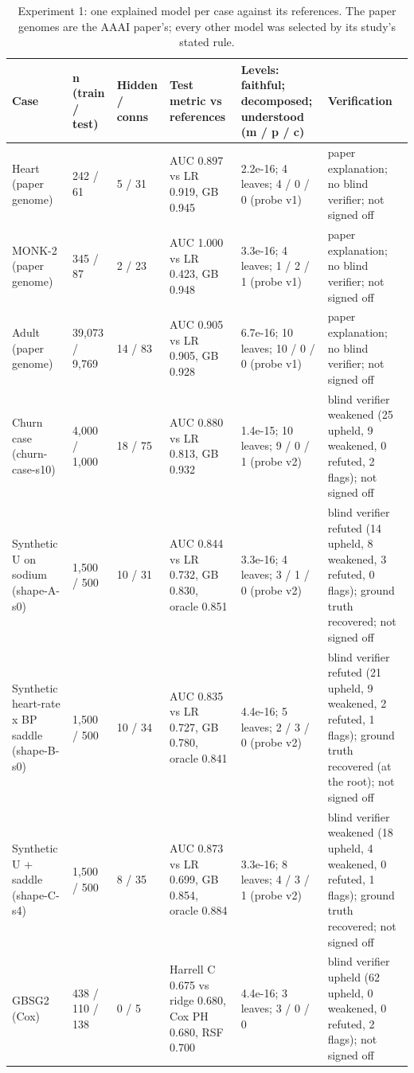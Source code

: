 \begin{table}[htbp]
\centering
\small
\caption{Experiment 1: one explained model per case against its references. The paper genomes are the AAAI paper's; every other model was selected by its study's stated rule.}
\label{tab:ch7-exp1-cases}
\begin{tabular}{p{3.2cm}p{1.6cm}p{1.4cm}p{3.6cm}p{3.6cm}p{3.2cm}}
\toprule
Case & n (train / test) & Hidden / conns & Test metric vs references & Levels: faithful; decomposed; understood (m / p / c) & Verification \\
\midrule
Heart (paper genome) & 242 / 61 & 5 / 31 & AUC 0.897 vs LR 0.919, GB 0.945 & 2.2e-16; 4 leaves; 4 / 0 / 0 (probe v1) & paper explanation; no blind verifier; not signed off \\
MONK-2 (paper genome) & 345 / 87 & 2 / 23 & AUC 1.000 vs LR 0.423, GB 0.948 & 3.3e-16; 4 leaves; 1 / 2 / 1 (probe v1) & paper explanation; no blind verifier; not signed off \\
Adult (paper genome) & 39,073 / 9,769 & 14 / 83 & AUC 0.905 vs LR 0.905, GB 0.928 & 6.7e-16; 10 leaves; 10 / 0 / 0 (probe v1) & paper explanation; no blind verifier; not signed off \\
Churn case (churn-case-s10) & 4,000 / 1,000 & 18 / 75 & AUC 0.880 vs LR 0.813, GB 0.932 & 1.4e-15; 10 leaves; 9 / 0 / 1 (probe v2) & blind verifier weakened (25 upheld, 9 weakened, 0 refuted, 2 flags); not signed off \\
Synthetic U on sodium (shape-A-s0) & 1,500 / 500 & 10 / 31 & AUC 0.844 vs LR 0.732, GB 0.830, oracle 0.851 & 3.3e-16; 4 leaves; 3 / 1 / 0 (probe v2) & blind verifier refuted (14 upheld, 8 weakened, 3 refuted, 0 flags); ground truth recovered; not signed off \\
Synthetic heart-rate x BP saddle (shape-B-s0) & 1,500 / 500 & 10 / 34 & AUC 0.835 vs LR 0.727, GB 0.780, oracle 0.841 & 4.4e-16; 5 leaves; 2 / 3 / 0 (probe v2) & blind verifier refuted (21 upheld, 9 weakened, 2 refuted, 1 flags); ground truth recovered (at the root); not signed off \\
Synthetic U + saddle (shape-C-s4) & 1,500 / 500 & 8 / 35 & AUC 0.873 vs LR 0.699, GB 0.854, oracle 0.884 & 3.3e-16; 8 leaves; 4 / 3 / 1 (probe v2) & blind verifier weakened (18 upheld, 4 weakened, 0 refuted, 1 flags); ground truth recovered; not signed off \\
\midrule
GBSG2 (Cox) & 438 / 110 / 138 & 0 / 5 & Harrell C 0.675 vs ridge 0.680, Cox PH 0.680, RSF 0.700 & 4.4e-16; 3 leaves; 3 / 0 / 0 & blind verifier upheld (62 upheld, 0 weakened, 0 refuted, 2 flags); not signed off \\

\end{tabular}
\end{table}
